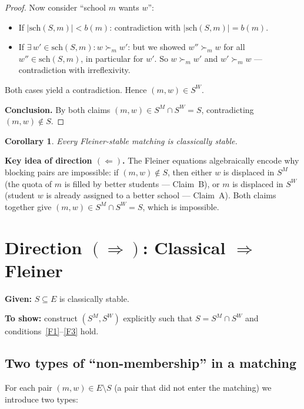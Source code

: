 \documentclass[12pt, a4paper]{article}
\theoremstyle{definition}
\theoremstyle{plain}
\newtheorem{corollary}[definition]{Corollary}
\theoremstyle{remark}
\newcommand{\SM}{S^M}
\newcommand{\SW}{S^W}
\newcommand{\school}[2]{\mathrm{sch}(#1,#2)}
\newcommand{\quota}{b}
\begin{document}
\begin{proof}
Now consider ``school $m$ wants $w$'':
\begin{itemize}
  \item If $|\school{S}{m}| < \quota(m)$: contradiction with
    $|\school{S}{m}| = \quota(m)$.
  \item If $\exists\, w' \in \school{S}{m} : w \succ_m w'$: but we showed
    $w'' \succ_m w$ for all $w'' \in \school{S}{m}$, in particular for $w'$.
    So $w \succ_m w'$ and $w' \succ_m w$ --- contradiction with irreflexivity.
\end{itemize}
Both cases yield a contradiction. Hence $(m, w) \in \SW$.

\medskip
\noindent\textbf{Conclusion.}
By both claims $(m, w) \in \SM \cap \SW = S$, contradicting $(m, w) \notin S$.
\end{proof}

\begin{corollary}
Every Fleiner-stable matching is classically stable.
\end{corollary}

\begin{orangebox}
\textbf{Key idea of direction $(\Leftarrow)$.}
The Fleiner equations algebraically encode why blocking pairs are impossible:
if $(m, w) \notin S$, then either $w$ is displaced in $\SM$ (the quota of $m$
is filled by better students --- Claim~B), or $m$ is displaced in $\SW$
(student $w$ is already assigned to a better school --- Claim~A). Both claims
together give $(m, w) \in \SM \cap \SW = S$, which is impossible.
\end{orangebox}

\section{Direction $(\Rightarrow)$: Classical $\Rightarrow$ Fleiner}

\textbf{Given:} $S \subseteq E$ is classically stable.

\textbf{To show:} construct $(\SM, \SW)$ explicitly such that $S = \SM \cap \SW$
and conditions~\eqref{F1}--\eqref{F3} hold.

\subsection{Two types of ``non-membership'' in a matching}

For each pair $(m, w) \in E \setminus S$ (a pair that did not enter the
matching) we introduce two types:
\end{document}
